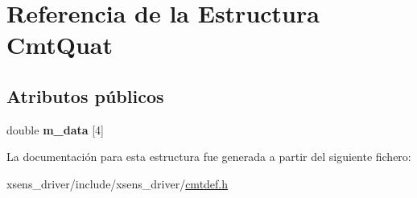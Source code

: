 \hypertarget{structCmtQuat}{\section{\-Referencia de la \-Estructura \-Cmt\-Quat}
\label{structCmtQuat}
}
\subsection*{\-Atributos públicos}
\begin{DoxyCompactItemize}
\item 
\hypertarget{structCmtQuat_a702370be2b582bd9ef9f369f5fd2edbe}{double {\bfseries m\-\_\-data} \mbox{[}4\mbox{]}}\label{structCmtQuat_a702370be2b582bd9ef9f369f5fd2edbe}

\end{DoxyCompactItemize}


\-La documentación para esta estructura fue generada a partir del siguiente fichero\-:\begin{DoxyCompactItemize}
\item 
xsens\-\_\-driver/include/xsens\-\_\-driver/\hyperlink{cmtdef_8h}{cmtdef.\-h}\end{DoxyCompactItemize}
